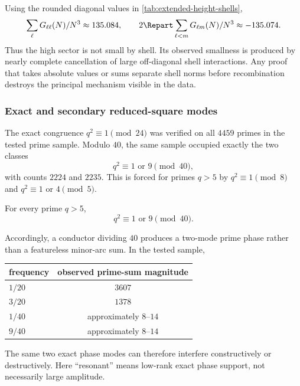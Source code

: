 Using the rounded diagonal values in \cref{tab:extended-height-shells},
\begin{equation}
 \sum_\ell G_{\ell\ell}(N)/N^3\approx135.084,
 \qquad
 2\Repart\sum_{\ell<m}G_{\ell m}(N)/N^3\approx-135.074.
 \label{eq:extended-cross-shell-cancellation}
\end{equation}
Thus the high sector is not small by shell.  Its observed smallness is produced by nearly complete cancellation of large off-diagonal shell interactions.  Any proof that takes absolute values or sums separate shell norms before recombination destroys the principal mechanism visible in the data.

\subsubsection{Exact and secondary reduced-square modes}

The exact congruence $q^2\equiv1\pmod{24}$ was verified on all $4459$ primes in the tested prime sample.  Modulo $40$, the same sample occupied exactly the two classes
\begin{equation}
 q^2\equiv1\text{ or }9\pmod{40},
 \label{eq:prime-square-mod40}
\end{equation}
with counts $2224$ and $2235$.  This is forced for primes $q>5$ by $q^2\equiv1\pmod8$ and $q^2\equiv1$ or $4\pmod5$.

\begin{proposition}
\label{prop:prime-square-mod40}
For every prime $q>5$,
\begin{equation}
 \boxed{q^2\equiv1\text{ or }9\pmod{40}.}
 \label{eq:prime-square-mod40-boxed}
\end{equation}
\end{proposition}

Accordingly, a conductor dividing $40$ produces a two-mode prime phase rather than a featureless minor-arc sum.  In the tested sample,
\begin{center}
\begin{tabular}{lc}
\toprule
frequency & observed prime-sum magnitude\\
\midrule
$1/20$ & $3607$\\
$3/20$ & $1378$\\
$1/40$ & approximately $8$--$14$\\
$9/40$ & approximately $8$--$14$\\
\bottomrule
\end{tabular}
\end{center}
The same two exact phase modes can therefore interfere constructively or destructively.  Here ``resonant'' means low-rank exact phase support, not necessarily large amplitude.

